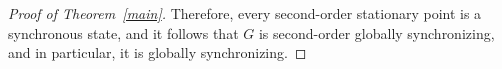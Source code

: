 \documentclass[10pt,a4paper]{amsart}
\begin{document}
\begin{proof}[Proof of Theorem~\ref{main}]
Therefore, every second-order stationary point is a synchronous state, and it follows that $G$ is second-order globally synchronizing, and in particular, it is globally synchronizing.
\end{proof}
\end{document}
